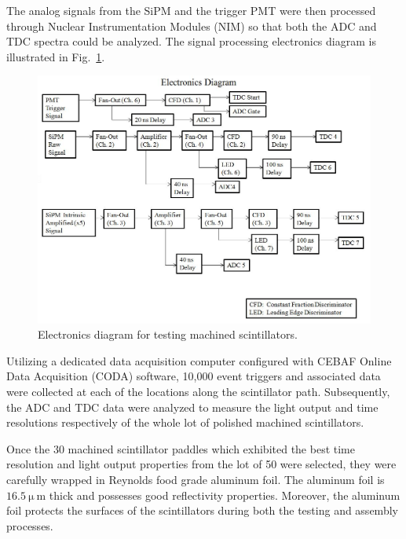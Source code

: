 The analog signals from the SiPM and the trigger PMT were then processed through Nuclear Instrumentation Modules (NIM) so that both the ADC and TDC spectra could be analyzed.  The signal processing electronics diagram is illustrated in Fig.~\ref{fig:nimelectronicsdiagram}.
	\begin{figure}[!htb]
		\centering
		\includegraphics[width=1.0\columnwidth]{fabrication/figs/nim_electronics_diagram}
		\caption{Electronics diagram for testing machined scintillators.}
		\label{fig:nimelectronicsdiagram}
	\end{figure}

Utilizing a dedicated data acquisition computer configured with CEBAF Online Data Acquisition (CODA) software, 10,000 event triggers and associated data were collected at each of the locations along the scintillator path.  Subsequently, the ADC and TDC data were analyzed to measure the light output and time resolutions respectively of the whole lot of polished machined scintillators.  

Once the 30 machined scintillator paddles which exhibited the best time resolution and light output properties from the lot of 50 were selected, they were carefully wrapped in Reynolds food grade aluminum foil.  The aluminum foil is $\mathrm{16.5~\mu~m}$ thick and possesses good reflectivity properties.  Moreover, the aluminum foil protects the surfaces of the scintillators during both the testing and assembly processes.
  
